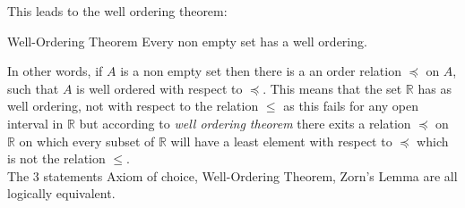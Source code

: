 \documentclass[16pt,a4paper]{article}
\theoremstyle{definition}
\begin{document}
This leads to the well ordering theorem:

\begin{thm}{Well-Ordering Theorem}{}
Every non empty set has a well ordering. 
\end{thm}

In other words, if $A$ is a non empty set then there is a an order relation $\preceq$ on $A$, such that $A$ is well ordered with respect to $\preceq$. This means that the set $\mathbb{R}$ has as well ordering, not with respect to the relation $\leq$ as this fails for any open interval in $\mathbb{R}$ but according to \textit{well ordering theorem} there exits a relation $\preceq$ on $\mathbb{R}$ on which every subset of $\mathbb{R}$ will have a least element with respect to $\preceq$ which is not the relation $\leq$. 
\\

The 3 statements Axiom of choice, Well-Ordering Theorem, Zorn's Lemma are all logically equivalent.    
\end{document}
